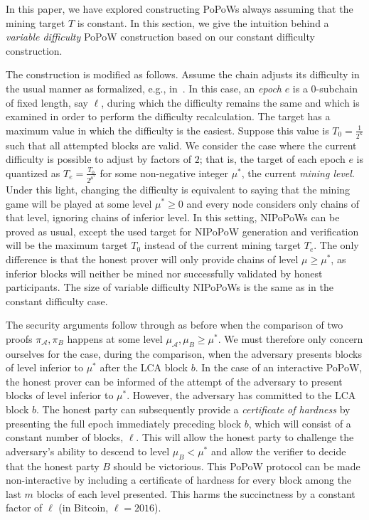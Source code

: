 
\label{sec:variable}

In this paper, we have explored constructing PoPoWs always assuming that the
mining target $T$ is constant. In this section, we give the intuition behind a
\emph{variable difficulty} PoPoW construction based on our constant difficulty
construction.

The construction is modified as follows. Assume the chain adjusts its difficulty
in the usual manner as formalized, e.g., in~\cite{backbone2}. In this case, an
\emph{epoch} $e$ is a $0$-subchain of fixed length, say $\ell$, during which the
difficulty remains the same and which is examined in order to perform the
difficulty recalculation. The target has a maximum value in which the difficulty
is the easiest. Suppose this value is $T_0 = \frac{1}{2^\kappa}$ such that all
attempted blocks are valid. We consider the case where the current difficulty is
possible to adjust by factors of $2$; that is, the target of each epoch $e$ is
quantized as $T_e = \frac{T_0}{2^{\mu^*}}$ for some non-negative integer
$\mu^*$, the current \emph{mining level}. Under this light, changing the
difficulty is equivalent to saying that the mining game will be played at some
level $\mu^* \geq 0$ and every node considers only chains of that level,
ignoring chains of inferior level. In this setting, NIPoPoWs can be proved as
usual, except the used target for NIPoPoW generation and verification will be
the maximum target $T_0$ instead of the current mining target $T_e$. The only
difference is that the honest prover will only provide chains of level $\mu \geq
\mu^*$, as inferior blocks will neither be mined nor successfully validated by
honest participants. The size of variable difficulty NIPoPoWs is the same as in
the constant difficulty case.

The security arguments follow through as before when the comparison of two
proofs $\pi_\mathcal{A}, \pi_B$ happens at some level $\mu_\mathcal{A}, \mu_B
\geq \mu^*$. We must therefore only concern ourselves for the case, during the
comparison, when the adversary presents blocks of level inferior to $\mu^*$
after the LCA block $b$. In the case of an interactive PoPoW, the honest prover
can be informed of the attempt of the adversary to present blocks of level
inferior to $\mu^*$. However, the adversary has committed to the LCA block $b$.
The honest party can subsequently provide a \emph{certificate of hardness} by
presenting the full epoch immediately preceding block $b$, which will consist of
a constant number of blocks, $\ell$. This will allow the honest party to
challenge the adversary's ability to descend to level $\mu_B < \mu^*$ and allow
the verifier to decide that the honest party $B$ should be victorious. This
PoPoW protocol can be made non-interactive by including a certificate of
hardness for every block among the last $m$ blocks of each level presented. This
harms the succinctness by a constant factor of $\ell$ (in Bitcoin,
$\ell = 2016$).

